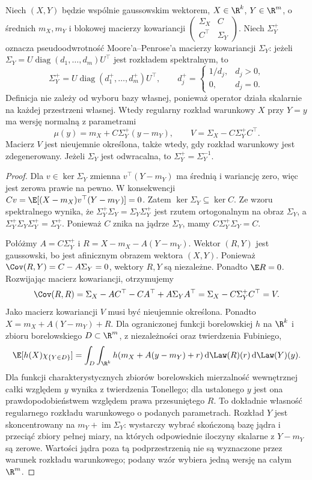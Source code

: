 \begin{twierdzenie}
Niech $(X,Y)$ będzie wspólnie gaussowskim wektorem,
$X\in\R^k$, $Y\in\R^m$, o średnich $m_X,m_Y$ i blokowej
macierzy kowariancji
$\left(\begin{smallmatrix}\Sigma_X&C\\ C^\top&\Sigma_Y\end{smallmatrix}\right)$.
Niech $\Sigma_Y^+$ oznacza pseudoodwrotność
Moore'a--Penrose'a macierzy kowariancji $\Sigma_Y$:
jeżeli $\Sigma_Y=U\operatorname{diag}(d_1,\ldots,d_m)U^\top$
jest rozkładem spektralnym, to
\[
\Sigma_Y^+=U\operatorname{diag}(d_1^+,\ldots,d_m^+)U^\top,
\qquad
d_j^+=\begin{cases}1/d_j,&d_j>0,\\0,&d_j=0.\end{cases}
\]
Definicja nie zależy od wyboru bazy własnej, ponieważ
operator działa skalarnie na każdej przestrzeni własnej.
Wtedy regularny rozkład warunkowy $X$ przy $Y=y$ ma
wersję normalną z parametrami
\[
\mu(y)=m_X+C\Sigma_Y^+(y-m_Y),\qquad
V=\Sigma_X-C\Sigma_Y^+C^\top.
\]
Macierz $V$ jest nieujemnie określona, także wtedy,
gdy rozkład warunkowy jest zdegenerowany.
Jeżeli $\Sigma_Y$ jest odwracalna, to $\Sigma_Y^+=\Sigma_Y^{-1}$.
\end{twierdzenie}
\begin{proof}
Dla $v\in\ker\Sigma_Y$ zmienna $v^\top(Y-m_Y)$
ma średnią i wariancję zero, więc jest zerowa prawie
na pewno. W konsekwencji
$Cv=\E[(X-m_X)v^\top(Y-m_Y)]=0$.
Zatem $\ker\Sigma_Y\subseteq\ker C$.
Ze wzoru spektralnego wynika, że
$\Sigma_Y^+\Sigma_Y=\Sigma_Y\Sigma_Y^+$ jest rzutem
ortogonalnym na obraz $\Sigma_Y$, a
$\Sigma_Y^+\Sigma_Y\Sigma_Y^+=\Sigma_Y^+$.
Ponieważ $C$ znika na jądrze $\Sigma_Y$,
mamy $C\Sigma_Y^+\Sigma_Y=C$.

Połóżmy $A=C\Sigma_Y^+$ i
$R=X-m_X-A(Y-m_Y)$. Wektor $(R,Y)$ jest gaussowski,
bo jest afinicznym obrazem wektora $(X,Y)$.
Ponieważ
$\Cov(R,Y)=C-A\Sigma_Y=0$,
wektory $R,Y$ są niezależne. Ponadto $\E R=0$.
Rozwijając macierz kowariancji, otrzymujemy
\[
\Cov(R,R)=\Sigma_X-AC^\top-CA^\top+A\Sigma_YA^\top
=\Sigma_X-C\Sigma_Y^+C^\top=V.
\]
Jako macierz kowariancji $V$ musi być nieujemnie określona.
Ponadto $X=m_X+A(Y-m_Y)+R$. Dla ograniczonej funkcji
borelowskiej $h$ na $\R^k$ i zbioru borelowskiego
$D\subset\R^m$, z niezależności oraz twierdzenia Fubiniego,
\[
\E[h(X)\chi_{\{Y\in D\}}]
=\int_D\int_{\R^k}h(m_X+A(y-m_Y)+r)
\,\mathrm d\Law(R)(r)\,\mathrm d\Law(Y)(y).
\]
Dla funkcji charakterystycznych zbiorów borelowskich
mierzalność wewnętrznej całki względem $y$ wynika
z twierdzenia Tonellego; dla ustalonego $y$ jest ona
prawdopodobieństwem względem prawa przesuniętego $R$.
To dokładnie własność regularnego rozkładu warunkowego
o podanych parametrach. Rozkład $Y$ jest skoncentrowany
na $m_Y+\operatorname{im}\Sigma_Y$: wystarczy wybrać
skończoną bazę jądra i przeciąć zbiory pełnej miary,
na których odpowiednie iloczyny skalarne z $Y-m_Y$
są zerowe. Wartości jądra poza tą podprzestrzenią
nie są wyznaczone przez warunek rozkładu warunkowego;
podany wzór wybiera jedną wersję na całym $\R^m$.
\end{proof}

